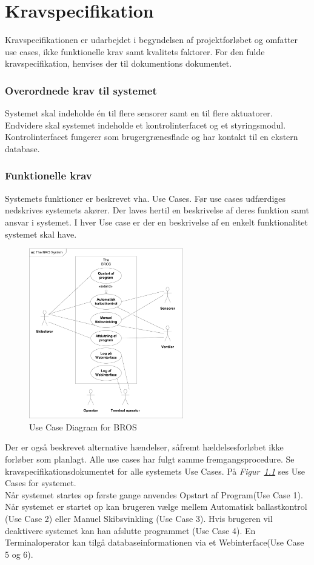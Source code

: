 \chapter{Kravspecifikation}
Kravspecifikationen er udarbejdet i begyndelsen af projektforløbet og omfatter use cases, ikke funktionelle krav samt kvalitets faktorer. For den fulde kravspecifikation, henvises der til dokumentions dokumentet.

\subsection{Overordnede krav til systemet}
Systemet skal indeholde én til flere sensorer samt en til flere aktuatorer. Endvidere skal systemet indeholde et kontrolinterfacet og et styringsmodul. Kontrolinterfacet fungerer som brugergrænesflade og har kontakt til en ekstern database.

\subsection{Funktionelle krav}
Systemets funktioner er beskrevet vha. Use Cases. Før use cases udfærdiges nedskrives systemets akører. Der laves hertil en beskrivelse af deres funktion samt ansvar i systemet. I hver Use case er der en beskrivelse af en enkelt funktionalitet systemet skal have.
\begin{figure}[H]
\centering
\includegraphics[width=0.6\textwidth]{billeder/UCDBROS}
\caption{Use Case Diagram for BROS}
\label{fig:UCDBROS}
\end{figure}
Der er også beskrevet alternative hændelser, såfremt hældelsesforløbet ikke forløber som planlagt. Alle use cases har fulgt samme fremgangsprocedure. Se kravspecifikationsdokumentet for alle systemets Use Cases. På \textit{Figur~\ref{fig:UCDBROS}} ses Use Cases for systemet.\\
Når systemet startes op første gange anvendes Opstart af Program(Use Case 1). Når systemet er startet op kan brugeren vælge mellem Automatisk ballastkontrol (Use Case 2) eller Manuel Skibsvinkling (Use Case 3). Hvis brugeren vil deaktivere systemet kan han afslutte programmet (Use Case 4). En Terminaloperator kan tilgå databaseinformationen via et Webinterface(Use Case 5 og 6).


